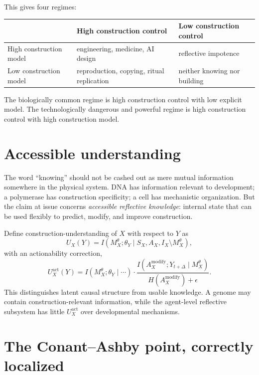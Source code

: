 \documentclass[11pt]{article}
\newcommand{\MI}{I}
\begin{document}
This gives four regimes:
\begin{center}
\begin{tabular}{lll}
\toprule
 & High construction control & Low construction control \\
\midrule
High construction model & engineering, medicine, AI design & reflective impotence \\
Low construction model & reproduction, copying, ritual replication & neither knowing nor building \\
\bottomrule
\end{tabular}
\end{center}

The biologically common regime is high construction control with low explicit model. The technologically dangerous and powerful regime is high construction control with high construction model.

\section{Accessible understanding}

The word ``knowing'' should not be cashed out as mere mutual information somewhere in the physical system. DNA has information relevant to development; a polymerase has construction specificity; a cell has mechanistic organization. But the claim at issue concerns \emph{accessible reflective knowledge}: internal state that can be used flexibly to predict, modify, and improve construction.

Define construction-understanding of $X$ with respect to $Y$ as
\begin{equation}
  U_X(Y)=\MI(M_X^\theta;\theta_Y\mid S_X,A_X,I_X\setminus M_X^\theta),
\end{equation}
with an actionability correction,
\begin{equation}
  U_X^{\mathrm{act}}(Y)=\MI(M_X^\theta;\theta_Y\mid \cdots)\cdot
  \frac{\MI(A_X^{\mathrm{modify}};Y_{t+\Delta}\mid M_X^\theta)}{H(A_X^{\mathrm{modify}})+\epsilon}.
\end{equation}
This distinguishes latent causal structure from usable knowledge. A genome may contain construction-relevant information, while the agent-level reflective subsystem has little $U_X^{\mathrm{act}}$ over developmental mechanisms.

\section{The Conant--Ashby point, correctly localized}
\end{document}
